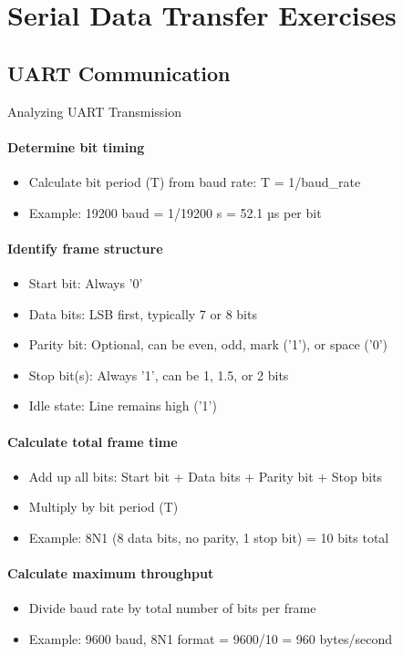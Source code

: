 \section{Serial Data Transfer Exercises}

\subsection{UART Communication}

\begin{KR}{Analyzing UART Transmission}
\paragraph{Determine bit timing}
\begin{itemize}
    \item Calculate bit period (T) from baud rate: T = 1/baud\_rate
    \item Example: 19200 baud = 1/19200 s = 52.1 µs per bit
\end{itemize}

\paragraph{Identify frame structure}
\begin{itemize}
    \item Start bit: Always '0'
    \item Data bits: LSB first, typically 7 or 8 bits
    \item Parity bit: Optional, can be even, odd, mark ('1'), or space ('0')
    \item Stop bit(s): Always '1', can be 1, 1.5, or 2 bits
    \item Idle state: Line remains high ('1')
\end{itemize}

\paragraph{Calculate total frame time}
\begin{itemize}
    \item Add up all bits: Start bit + Data bits + Parity bit + Stop bits
    \item Multiply by bit period (T)
    \item Example: 8N1 (8 data bits, no parity, 1 stop bit) = 10 bits total
\end{itemize}

\paragraph{Calculate maximum throughput}
\begin{itemize}
    \item Divide baud rate by total number of bits per frame
    \item Example: 9600 baud, 8N1 format = 9600/10 = 960 bytes/second
\end{itemize}


\end{KR}
